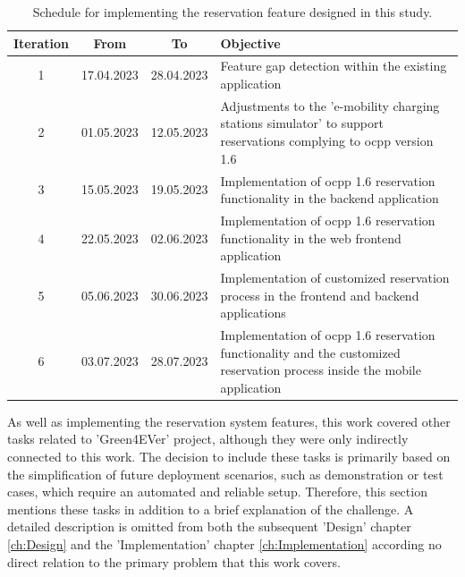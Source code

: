 \begingroup
\setlength{\tabcolsep}{10pt} %
\renewcommand{\arraystretch}{1.5} %
\begin{table}[h]
    \centering
    \caption{Schedule for implementing the reservation feature designed in this study.}
    \begin{tabular}{c|c|c|m{7cm}}
        Iteration & From & To & Objective \\
        \hline
        1 & 17.04.2023 & 28.04.2023 & Feature gap detection within the existing application \\
        2 & 01.05.2023 & 12.05.2023 & Adjustments to the 'e-mobility charging stations simulator' \cite{noauthor_github_nodate-3} to support reservations complying to \acrshort{ocpp} version 1.6 \\
        3 & 15.05.2023 & 19.05.2023 & Implementation of \acrshort{ocpp} 1.6 reservation functionality in the backend application \\
        4 & 22.05.2023 & 02.06.2023 & Implementation of \acrshort{ocpp} 1.6 reservation functionality in the web frontend application \\
        5 & 05.06.2023 & 30.06.2023 & Implementation of customized reservation process in the frontend and backend applications \\
        6 & 03.07.2023 & 28.07.2023 & Implementation of \acrshort{ocpp} 1.6 reservation functionality and the customized reservation process inside the mobile application \\
    \end{tabular}
    \label{tab:development-iterations}
\end{table}
\endgroup

As well as implementing the reservation system features, this work covered other tasks related to 'Green4EVer' \cite{noauthor_hka_nodate} project, although they were only indirectly connected to this work.
The decision to include these tasks is primarily based on the simplification of future deployment scenarios, such as demonstration or test cases, which require an automated and reliable setup.
Therefore, this section mentions these tasks in addition to a brief explanation of the challenge. A detailed description is omitted from both the subsequent 'Design' chapter \ref{ch:Design} and the 'Implementation' chapter \ref{ch:Implementation} according no direct relation to the primary problem that this work covers.

